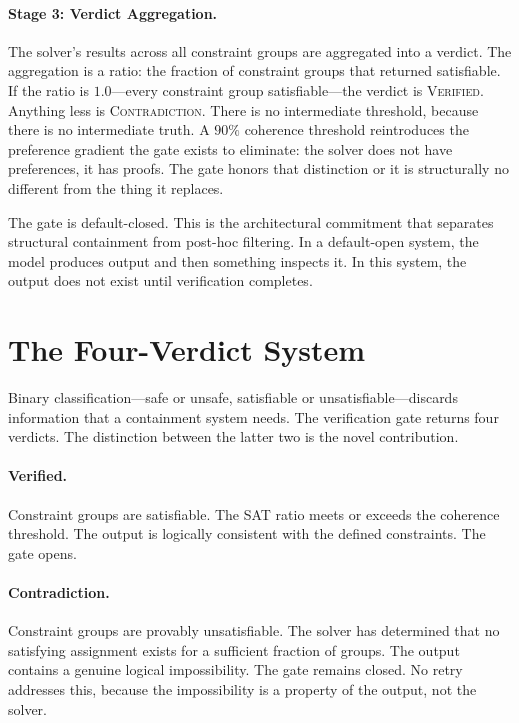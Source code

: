\documentclass[11pt,a4paper]{article}
\begin{document}
\paragraph{Stage 3: Verdict Aggregation.}
The solver's results across all constraint groups are aggregated into a verdict.
The aggregation is a ratio: the fraction of constraint groups that returned satisfiable.
If the ratio is $1.0$---every constraint group satisfiable---the verdict is \textsc{Verified}.
Anything less is \textsc{Contradiction}.
There is no intermediate threshold, because there is no intermediate truth.
A $90\%$ coherence threshold reintroduces the preference gradient the gate exists to eliminate: the solver does not have preferences, it has proofs.
The gate honors that distinction or it is structurally no different from the thing it replaces.

The gate is default-closed.
This is the architectural commitment that separates structural containment from post-hoc filtering.
In a default-open system, the model produces output and then something inspects it.
In this system, the output does not exist until verification completes.

\section{The Four-Verdict System}

Binary classification---safe or unsafe, satisfiable or unsatisfiable---discards information that a containment system needs.
The verification gate returns four verdicts.
The distinction between the latter two is the novel contribution.

\paragraph{Verified.}
Constraint groups are satisfiable.
The SAT ratio meets or exceeds the coherence threshold.
The output is logically consistent with the defined constraints.
The gate opens.

\paragraph{Contradiction.}
Constraint groups are provably unsatisfiable.
The solver has determined that no satisfying assignment exists for a sufficient fraction of groups.
The output contains a genuine logical impossibility.
The gate remains closed.
No retry addresses this, because the impossibility is a property of the output, not the solver.
\end{document}
